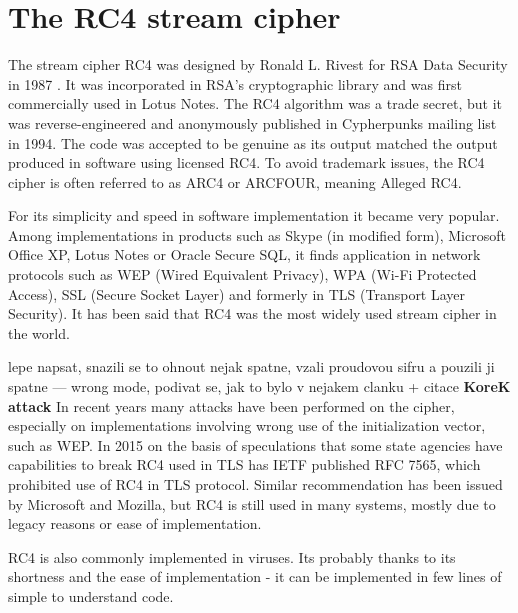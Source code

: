 \chapter{The RC4 stream cipher}
The stream cipher RC4 was designed by Ronald L. Rivest for RSA Data Security in 1987 \cite{RS14}. It was incorporated in RSA's cryptographic library and was first commercially used in Lotus Notes. The RC4 algorithm was a trade secret, but it was reverse-engineered and anonymously published in Cypherpunks mailing list  \cite{cypherpunks} in 1994. The code was accepted to be genuine as its output matched the output produced in software using licensed RC4. To avoid trademark issues, the RC4 cipher is often referred to as ARC4 or ARCFOUR, meaning Alleged RC4. 

For its simplicity and speed in software implementation it became very popular. Among implementations in products such as Skype (in modified form), Microsoft Office XP, Lotus Notes or Oracle Secure SQL, it finds application in network protocols such as WEP (Wired Equivalent Privacy), WPA (Wi-Fi Protected Access), SSL (Secure Socket Layer) and formerly in TLS (Transport Layer Security). It has been said that RC4 was the most widely used stream cipher in the world. 


\TODO lepe napsat, snazili se to ohnout nejak spatne, vzali proudovou sifru a pouzili ji spatne --- wrong mode, podivat se, jak to bylo v nejakem clanku + citace \textbf{KoreK attack}
In recent years many attacks have been performed on the cipher, especially on implementations involving wrong use of the initialization vector, such as WEP. In 2015 on the basis of speculations that some state agencies have capabilities to break RC4 used in TLS has IETF published RFC 7565, which prohibited use of RC4 in TLS protocol. Similar recommendation has been issued by Microsoft and Mozilla, but RC4 is still used in many systems, mostly due to legacy reasons or ease of implementation. 

RC4 is also commonly implemented in viruses. Its probably thanks to its shortness and the ease of implementation - it can be implemented in few lines of simple to understand code.


